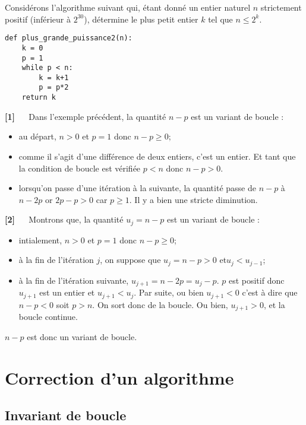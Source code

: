 Considérons l’algorithme suivant qui, étant donné un entier naturel $n$ strictement positif (inférieur à $2^{30}$), détermine le plus petit entier $k$ tel que $n \leq 2^k$.
\begin{lstlisting}
def plus_grande_puissance2(n):
    k = 0
    p = 1
    while p < n:
        k = k+1
        p = p*2
    return k
\end{lstlisting}
\textbf{[1]} $\quad$
Dans l’exemple précédent, la quantité $n - p$ est un variant de boucle :
\begin{itemize}
\item au départ, $n > 0$ et $p = 1$ donc $n - p \geq 0$;
\item comme il s’agit d’une différence de deux entiers, c’est un entier. Et tant que la condition
de boucle est vérifiée $p < n$ donc $n - p > 0$.
\item lorsqu’on passe d’une itération à la suivante, la quantité passe de $n-p$ à $n-2p$ or $2p-p > 0$
car $p \geq 1$. Il y a bien une stricte diminution.
\end{itemize}

\textbf{[2]} $\quad$
Montrons que, la quantité $u_j = n - p$ est un variant de boucle :
\begin{itemize}
\item intialement, $n > 0$ et $p = 1$ donc $n - p \geq 0$;
\item à la fin de l'itération $j$, on suppose que $u_j = n - p >0 $ et$u_j < u_{j-1}$;
\item à la fin de l'itération suivante, $u_{j+1}=n-2p = u_j - p$. $p$ est positif donc $u_{j+1}$ est un entier et $u_{j+1}<u_j$. Par suite, ou bien $u_{j+1}<0$ c'est à dire que $n-p<0$ soit $p>n$. On sort donc de la boucle. Ou bien, $u_{j+1}>0$, et la boucle continue.
\end{itemize}
$n - p$ est donc un variant de boucle.

\section{Correction d'un algorithme}
\subsection{Invariant de boucle}

